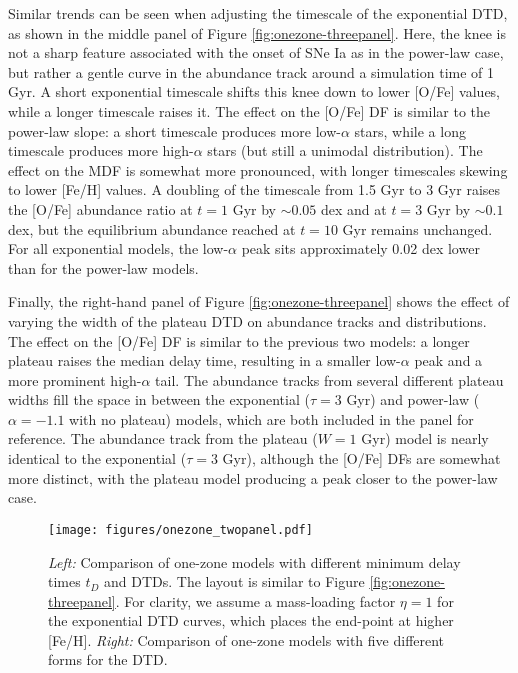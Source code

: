 \documentclass[twocolumn,twocolappendix,linenumbers,trackchanges]{aastex631}
\begin{document}
Similar trends can be seen when adjusting the timescale of the exponential DTD, as shown in the middle panel of Figure \ref{fig:onezone-threepanel}. Here, the knee is not a sharp feature associated with the onset of SNe Ia as in the power-law case, but rather a gentle curve in the abundance track around a simulation time of 1 Gyr. A short exponential timescale shifts this knee down to lower [O/Fe] values, while a longer timescale raises it. The effect on the [O/Fe] DF is similar to the power-law slope: a short timescale produces more low-$\alpha$ stars, while a long timescale produces more high-$\alpha$ stars (but still a unimodal distribution). The effect on the MDF is somewhat more pronounced, with longer timescales skewing to lower [Fe/H] values. A doubling of the timescale from 1.5 Gyr to 3 Gyr raises the [O/Fe] abundance ratio at $t=1$ Gyr by $\sim0.05$ dex and at $t=3$ Gyr by $\sim0.1$ dex, but the equilibrium abundance reached at $t=10$ Gyr remains unchanged. For all exponential models, the low-$\alpha$ peak sits approximately 0.02 dex lower than for the power-law models.

Finally, the right-hand panel of Figure \ref{fig:onezone-threepanel} shows the effect of varying the width of the plateau DTD on abundance tracks and distributions. The effect on the [O/Fe] DF is similar to the previous two models: a longer plateau raises the median delay time, resulting in a smaller low-$\alpha$ peak and a more prominent high-$\alpha$ tail. The abundance tracks from several different plateau widths fill the space in between the exponential ($\tau=3$ Gyr) and power-law ($\alpha=-1.1$ with no plateau) models, which are both included in the panel for reference. The abundance track from the plateau ($W=1$ Gyr) model is nearly identical to the exponential ($\tau=3$ Gyr), although the [O/Fe] DFs are somewhat more distinct, with the plateau model producing a peak closer to the power-law case.

\begin{figure*}
    \centering
    \texttt{[image: figures/onezone\_twopanel.pdf]}
    \caption{\textit{Left:} Comparison of one-zone models with different minimum delay times $t_D$ and DTDs.
    The layout is similar to Figure \ref{fig:onezone-threepanel}. For clarity, we assume a mass-loading factor $\eta=1$ for the exponential DTD curves, which places the end-point at higher [Fe/H].
    \textit{Right:} Comparison of one-zone models with five different forms for the DTD.
    }
    \label{fig:onezone-twopanel}
\end{figure*}
\end{document}
